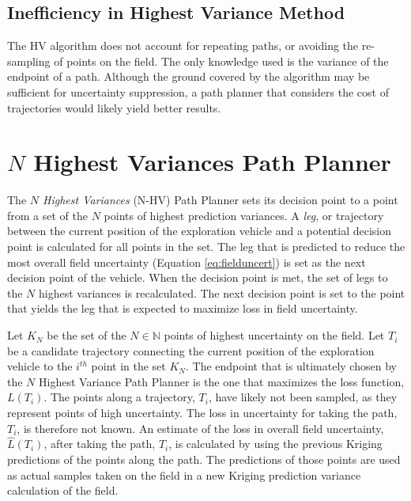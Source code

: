 \subsection{Inefficiency in Highest Variance Method}
The HV algorithm does not account for repeating paths, or avoiding the re-sampling of points on the field. The only knowledge used is the variance of the endpoint of a path. Although the ground covered by the algorithm may be sufficient for uncertainty suppression, a path planner that considers the cost of trajectories would likely yield better results.

\section{$N$ Highest Variances Path Planner} \label{sec:nnhv}
The \textit{$N$ Highest Variances} (N-HV) Path Planner sets its decision point to a point from a set of the $N$ points of highest prediction variances. A \textit{leg}, or trajectory between the current position of the exploration vehicle and a potential decision point is calculated for all points in the set. The leg that is predicted to reduce the most overall field uncertainty (Equation \ref{eq:fielduncert}) is set as the next decision point of the vehicle. When the decision point is met, the set of legs to the $N$ highest variances is recalculated. The next decision point is set to the point that yields the leg that is expected to maximize loss in field uncertainty.

Let $K_N$ be the set of the $N \in \mathbb{N}$ points of highest uncertainty on the field. Let $T_i$ be a candidate trajectory connecting the current position of the exploration vehicle to the $i^{th}$ point in the set $K_N$. The endpoint that is ultimately chosen by the $N$ Highest Variance Path Planner is the one that maximizes the loss function, $L(T_i)$. The points along a trajectory, $T_i$, have likely not been sampled, as they represent points of high uncertainty. The loss in uncertainty for taking the path, $T_i$, is therefore not known. An estimate of the loss in overall field uncertainty, $\hat{L}(T_i)$, after taking the path, $T_i$, is calculated by using the previous Kriging predictions of the points along the path. The predictions of those points are used as actual samples taken on the field in a new Kriging prediction variance calculation of the field.

